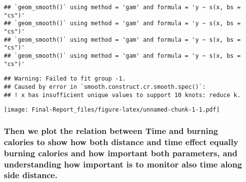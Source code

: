 \documentclass[
]{article}
\begin{document}
\begin{verbatim}
## `geom_smooth()` using method = 'gam' and formula = 'y ~ s(x, bs = "cs")'
## `geom_smooth()` using method = 'gam' and formula = 'y ~ s(x, bs = "cs")'
## `geom_smooth()` using method = 'gam' and formula = 'y ~ s(x, bs = "cs")'
## `geom_smooth()` using method = 'gam' and formula = 'y ~ s(x, bs = "cs")'
\end{verbatim}

\begin{verbatim}
## Warning: Failed to fit group -1.
## Caused by error in `smooth.construct.cr.smooth.spec()`:
## ! x has insufficient unique values to support 10 knots: reduce k.
\end{verbatim}

\texttt{[image: Final-Report\_files/figure-latex/unnamed-chunk-1-1.pdf]}

\subsubsection{Then we plot the relation between Time and burning
calories to show how both distance and time effect equally burning
calories and how important both parameters, and understanding how
important is to monitor also time along side
distance.}\label{then-we-plot-the-relation-between-time-and-burning-calories-to-show-how-both-distance-and-time-effect-equally-burning-calories-and-how-important-both-parameters-and-understanding-how-important-is-to-monitor-also-time-along-side-distance.}
\end{document}
